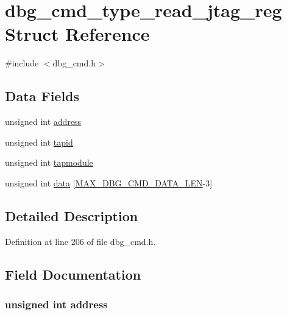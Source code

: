 \hypertarget{structdbg__cmd__type__read__jtag__reg}{\section{dbg\-\_\-cmd\-\_\-type\-\_\-read\-\_\-jtag\-\_\-reg Struct Reference}
\label{structdbg__cmd__type__read__jtag__reg}
}


{\ttfamily \#include $<$dbg\-\_\-cmd.\-h$>$}

\subsection*{Data Fields}
\begin{DoxyCompactItemize}
\item 
unsigned int \hyperlink{structdbg__cmd__type__read__jtag__reg_a2f55ff1f6cd45ca1b6431493ab5614eb}{address}
\item 
unsigned int \hyperlink{structdbg__cmd__type__read__jtag__reg_ab45a32c579f91cd302a98e9f3000e245}{tapid}
\item 
unsigned int \hyperlink{structdbg__cmd__type__read__jtag__reg_a81cc17fe846b9d6fa02f6ebccb89a542}{tapmodule}
\item 
unsigned int \hyperlink{structdbg__cmd__type__read__jtag__reg_a728dc245dc576de10147524d6a701ef3}{data} \mbox{[}\hyperlink{dbg__cmd_8h_a4552ec15033c8a68870cdf80eda5470c}{M\-A\-X\-\_\-\-D\-B\-G\-\_\-\-C\-M\-D\-\_\-\-D\-A\-T\-A\-\_\-\-L\-E\-N}-\/3\mbox{]}
\end{DoxyCompactItemize}


\subsection{Detailed Description}


Definition at line 206 of file dbg\-\_\-cmd.\-h.



\subsection{Field Documentation}
\hypertarget{structdbg__cmd__type__read__jtag__reg_a2f55ff1f6cd45ca1b6431493ab5614eb}{
\subsubsection[{address}]{\setlength{\rightskip}{0pt plus 5cm}unsigned int address}}\label{structdbg__cmd__type__read__jtag__reg_a2f55ff1f6cd45ca1b6431493ab5614eb}


